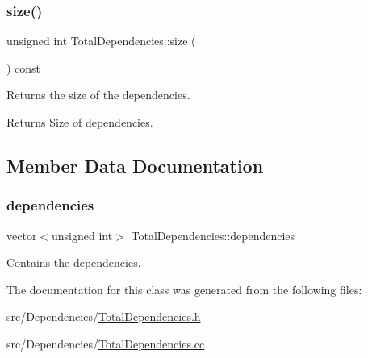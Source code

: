 \subsubsection{\texorpdfstring{size()}{size()}}
{\footnotesize\ttfamily unsigned int Total\+Dependencies\+::size (\begin{DoxyParamCaption}{ }\end{DoxyParamCaption}) const}



Returns the size of the dependencies. 

\begin{DoxyReturn}{Returns}
Size of dependencies. 
\end{DoxyReturn}


\subsection{Member Data Documentation}
\mbox{\label{class_total_dependencies_a94825b4f782c30dfebf69dd2eba0bb1f}} 
\subsubsection{\texorpdfstring{dependencies}{dependencies}}
{\footnotesize\ttfamily vector$<$unsigned int$>$ Total\+Dependencies\+::dependencies\hspace{0.3cm}{\ttfamily [private]}}



Contains the dependencies. 



The documentation for this class was generated from the following files\+:\begin{DoxyCompactItemize}
\item 
src/\+Dependencies/\hyperlink{_total_dependencies_8h}{Total\+Dependencies.\+h}\item 
src/\+Dependencies/\hyperlink{_total_dependencies_8cc}{Total\+Dependencies.\+cc}\end{DoxyCompactItemize}
